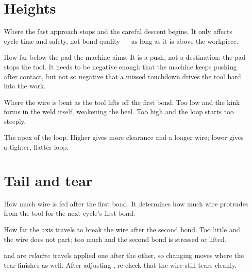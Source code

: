 \section{Heights}

\begin{description}[leftmargin=!,labelwidth=26mm,style=nextline,font=\normalfont\ttfamily]

\item[Search 1 / Search 2] Where the fast approach stops and the careful
  descent begins. It only affects cycle time and safety, not bond quality ---
  as long as it is above the workpiece.

\item[Overtravel] How far below the pad the machine aims. It is a push, not a
  destination: the pad stops the tool. It needs to be negative enough that the
  machine keeps pushing after contact, but not so negative that a missed
  touchdown drives the tool hard into the work.

\item[Kink Height] Where the wire is bent as the tool lifts off the first bond.
  Too low and the kink forms in the weld itself, weakening the heel. Too high
  and the loop starts too steeply.

\item[Loop Height] The apex of the loop. Higher gives more clearance and a
  longer wire; lower gives a tighter, flatter loop.

\end{description}

\section{Tail and tear}

\begin{description}[leftmargin=!,labelwidth=26mm,style=nextline,font=\normalfont\ttfamily]

\item[Tail] How much wire is fed after the first bond. It determines how much
  wire protrudes from the tool for the next cycle's first bond.

\item[Tear] How far the axis travels to break the wire after the second bond.
  Too little and the wire does not part; too much and the second bond is
  stressed or lifted.

\end{description}

\begin{wbwarning}
 and  are \emph{relative} travels applied one
after the other, so changing  moves where the tear finishes as
well. After adjusting , re-check that the wire still tears
cleanly.
\end{wbwarning}

